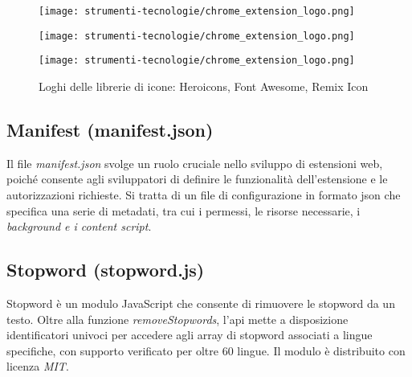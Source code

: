 \vspace{5pt}
\begin{figure}[H]
  \centering
  \begin{minipage}{0.3\columnwidth}
    \centering
    \texttt{[image: strumenti-tecnologie/chrome\_extension\_logo.png]} 
  \end{minipage}
  \hfill
  \begin{minipage}{0.3\columnwidth}
    \centering
    \texttt{[image: strumenti-tecnologie/chrome\_extension\_logo.png]} 
  \end{minipage}
  \hfill
  \begin{minipage}{0.3\columnwidth}
    \centering
    \texttt{[image: strumenti-tecnologie/chrome\_extension\_logo.png]} 
  \end{minipage}
  \caption{Loghi delle librerie di icone: Heroicons, Font Awesome, Remix Icon}
  \label{fig:loghi_librerie_icone}
\end{figure}
\vspace{5pt}

\subsection*{Manifest (manifest.json)}

\par Il file \textit{manifest.json} svolge un ruolo cruciale nello sviluppo di estensioni web, poiché consente agli sviluppatori di definire le funzionalità dell’estensione e le autorizzazioni richieste. Si tratta di un file di configurazione in formato \gls{json} che specifica una serie di metadati, tra cui i permessi, le risorse necessarie, i \textit{background e i content script}.

\subsection*{Stopword (stopword.js)}

\par Stopword è un modulo JavaScript che consente di rimuovere le \gls{stopword} da un testo. Oltre alla funzione \textit{removeStopwords}, l’\gls{api} mette a disposizione identificatori univoci per accedere agli array di \gls{stopword} associati a lingue specifiche, con supporto verificato per oltre 60 lingue. Il modulo è distribuito con licenza \textit{MIT}.